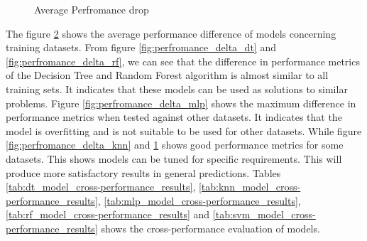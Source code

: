 \begin{figure}[H]
\begin{subfigure}{.5\columnwidth}
        \caption{}
        \label{fig:perfromance_delta_svm}
    \end{subfigure}
\caption{Average Perfromance drop}
\label{fig:perfromance_delta}
\end{figure}

The figure \ref{fig:perfromance_delta} shows the average performance difference of models
concerning training datasets. From figure \ref{fig:perfromance_delta_dt} and
\ref{fig:perfromance_delta_rf}, we can see that the difference in performance metrics of the
Decision Tree and Random Forest algorithm is almost similar to all training sets. It indicates
that these models can be used as solutions to similar problems. Figure
\ref{fig:perfromance_delta_mlp} shows the maximum difference in performance metrics when tested
against other datasets. It indicates that the model is overfitting and is not suitable to be
used for other datasets. While figure \ref{fig:perfromance_delta_knn} and
\ref{fig:perfromance_delta_svm} shows good performance metrics for some datasets. This shows
models can be tuned for specific requirements. This will produce more satisfactory results in
general predictions. Tables \ref{tab:dt_model_cross-performance_results},
\ref{tab:knn_model_cross-performance_results}, \ref{tab:mlp_model_cross-performance_results},
\ref{tab:rf_model_cross-performance_results} and \ref{tab:svm_model_cross-performance_results}
shows the cross-performance evaluation of models.

